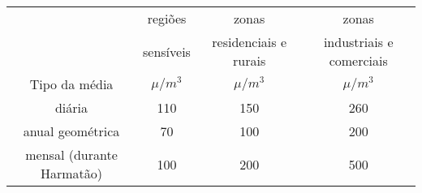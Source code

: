 \begin{tabular}{cccc}
\hline
                              &   regiões  &        zonas       &         zonas               \\
                              & sensíveis  & residenciais e rurais & industriais e comerciais      \\
Tipo da média                 & $\mu / m^3$ & $\mu / m^3$ & $\mu / m^3$      \\
\hline
diária                    & 110             & 150                      & 260         \\       
anual geométrica          & 70              & 100                      & 200                   \\
mensal (durante Harmatão) & 100             & 200                      & 500                     \\
\hline
\end{tabular}
